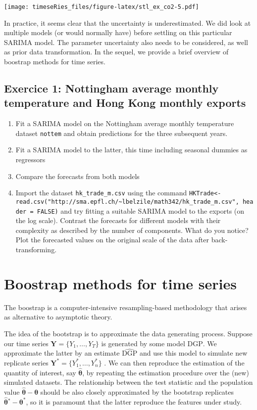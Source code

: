 \documentclass[]{book}
\providecommand{\tightlist}{%
  \setlength{\itemsep}{0pt}\setlength{\parskip}{0pt}}
\begin{document}
\texttt{[image: timeseRies\_files/figure-latex/stl\_ex\_co2-5.pdf]}

In practice, it seems clear that the uncertainty is underestimated. We
did look at multiple models (or would normally have) before settling on
this particular SARIMA model. The parameter uncertainty also needs to be
considered, as well as prior data transformation. In the sequel, we
provide a brief overview of boostrap methods for time series.

\subsection{Exercice 1: Nottingham average monthly temperature and Hong
Kong monthly
exports}\label{exercice-1-nottingham-average-monthly-temperature-and-hong-kong-monthly-exports}

\begin{enumerate}
\def\labelenumi{\arabic{enumi}.}
\tightlist
\item
  Fit a SARIMA model on the Nottingham average monthly temperature
  dataset \texttt{nottem} and obtain predictions for the three
  subsequent years.
\item
  Fit a SARIMA model to the latter, this time including seasonal dummies
  as regressors
\item
  Compare the forecasts from both models
\item
  Import the dataset \texttt{hk\_trade\_m.csv} using the command
  \texttt{HKTrade\textless{}-read.csv("http://sma.epfl.ch/\textasciitilde{}lbelzile/math342/hk\_trade\_m.csv",\ header\ =\ FALSE)}
  and try fitting a suitable SARIMA model to the exports (on the log
  scale). Contrast the forecasts for different models with their
  complexity as described by the number of components. What do you
  notice? Plot the forecasted values on the original scale of the data
  after back-transforming.
\end{enumerate}

\section{Boostrap methods for time
series}\label{boostrap-methods-for-time-series}

The boostrap is a computer-intensive resampling-based methodology that
arises as alternative to asymptotic theory.

The idea of the bootstrap is to approximate the data generating process.
Suppose our time series \(\boldsymbol{Y}=\{Y_1, \ldots, Y_T\}\) is
generated by some model \(\mathrm{DGP}\). We approximate the latter by
an estimate \(\widehat{\mathrm{DGP}}\) and use this model to simulate
new replicate series \(\boldsymbol{Y}^*=\{Y_1^* , \ldots , Y_n^*\}\) .
We can then reproduce the estimation of the quantity of interest, say
\(\widehat{\boldsymbol{\theta}}\), by repeating the estimation procedure
over the (new) simulated datasets. The relationship between the test
statistic and the population value
\(\widehat{\boldsymbol{\theta}}-\boldsymbol{\theta}\) should be also
closely approximated by the bootstrap replicates
\(\widehat{\boldsymbol{\theta}}{}^*-\boldsymbol{\theta}^*\), so it is
paramount that the latter reproduce the features under study.
\end{document}
